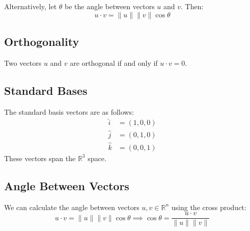 \documentclass{article}
\begin{document}
Alternatively, let $\theta$ be the angle between vectors $u$ and $v$. Then:
\begin{equation*}
    u\cdot v=\lVert u \rVert \lVert v \rVert\cos\theta
\end{equation*}

\subsection{Orthogonality}

Two vectors $u$ and $v$ are orthogonal if and only if $u\cdot v=0$.

\subsection{Standard Bases}

The standard basis vectors are as follows:
\begin{align*}
	\hat i &= (1,0,0) \\
	\hat j &= (0,1,0) \\
	\hat k &= (0,0,1)
\end{align*}
These vectors span the $\mathbb R^3$ space.

\subsection{Angle Between Vectors}

We can calculate the angle between vectors $u,v\in\mathbb R^n$ using the cross product:
\begin{equation*}
    u\cdot v=\lVert u \rVert \lVert v \rVert \cos\theta
	\implies \cos\theta=\frac{u\cdot v}{\lVert u \rVert \lVert v \rVert }
\end{equation*}
\end{document}

